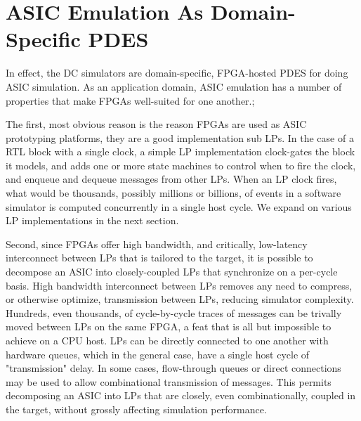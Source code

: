 \section{ASIC Emulation As Domain-Specific PDES}

In effect, the DC simulators are domain-specific, FPGA-hosted PDES for doing ASIC simulation.
As an application domain, ASIC emulation has a number of properties that make FPGAs well-suited for one another.;

The first, most obvious reason is the reason FPGAs are used as ASIC prototyping
platforms, they are a good implementation sub LPs. In the case of a RTL block with a single clock, a
simple LP implementation clock-gates the block it models, and adds one or more state
machines to control when to fire the clock, and enqueue and dequeue messages
from other LPs. When an LP clock fires, what would be thousands, possibly
millions or billions, of events in a software simulator is computed
concurrently in a single host cycle. We expand on various LP implementations in
the next section.

Second, since FPGAs offer high bandwidth, and critically, low-latency
interconnect between LPs that is tailored to the target, it is possible to
decompose an ASIC into closely-coupled LPs that synchronize on a per-cycle
basis. High bandwidth interconnect between LPs removes any need to compress, or
otherwise optimize, transmission between LPs, reducing simulator complexity.
Hundreds, even thousands, of cycle-by-cycle traces of messages can be trivally
moved between LPs on the same FPGA, a feat that is all but impossible to
achieve on a CPU host. LPs can be directly connected to one another with
hardware queues, which in the general case, have a single host cycle of
"transmission" delay. In some cases, flow-through queues or direct connections
may be used to allow combinational transmission of messages. This permits
decomposing an ASIC into LPs that are closely, even combinationally, coupled in
the target, without grossly affecting simulation performance.













